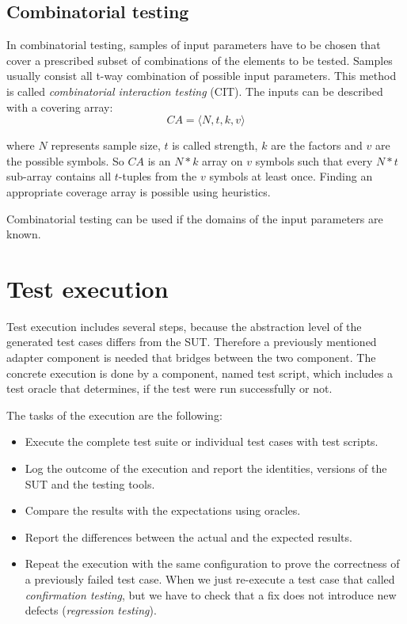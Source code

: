 
\subsection{Combinatorial testing}
\label{sub:combinatorialtesting}

In combinatorial testing, samples of input parameters have to be chosen that cover a prescribed subset of combinations of the elements to be tested. Samples usually consist all t-way combination of possible input parameters. This method is called \textit{combinatorial interaction testing} (CIT). The inputs can be described with a covering array:
\begin{displaymath}
CA=\langle N, t, k, v\rangle
\end{displaymath}

where $N$ represents sample size, $t$ is called strength, $k$ are the factors and $v$ are the possible symbols. So $CA$ is an $N * k$ array on $v$ symbols such that every $N * t$ sub-array contains all $t$-tuples from the $v$ symbols at least once. Finding an appropriate coverage array is possible using heuristics.

Combinatorial testing can be used if the domains of the input parameters are known.



\section{Test execution}
\label{sec:testexecution}

Test execution includes several steps, because the abstraction level of the generated test cases differs from the SUT. Therefore a previously mentioned adapter component is needed that bridges between the two component. The concrete execution is done by a component, named test script, which includes a test oracle that determines, if the test were run successfully or not.

The tasks of the execution are the following:

\begin{itemize}
	\item Execute the complete test suite or individual test cases with test scripts.
	\item Log the outcome of the execution and report the identities, versions of the SUT and the testing tools.
	\item Compare the results with the expectations using oracles.
	\item Report the differences between the actual and the expected results.
	\item Repeat the execution with the same configuration to prove the correctness of a previously failed test case. When we just re-execute a test case that called \textit{confirmation testing}, but we have to check that a fix does not introduce new defects (\textit{regression testing}).
\end{itemize}


